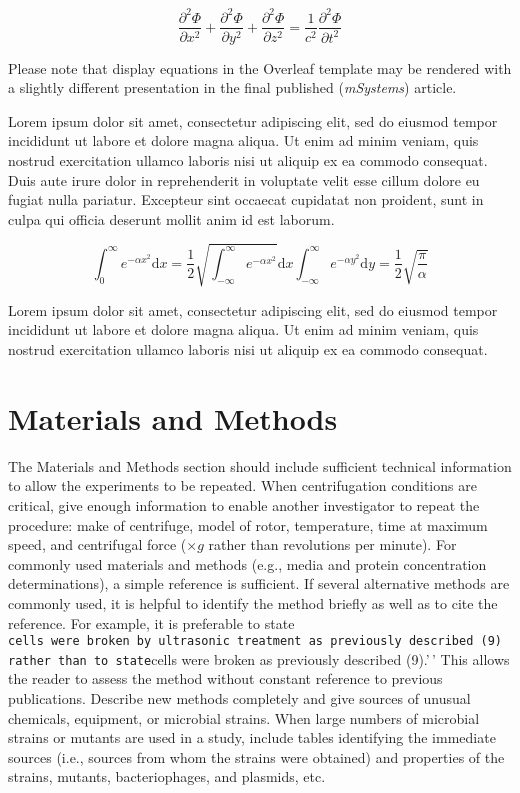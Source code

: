 \documentclass[
  lineno]{asm}
\begin{document}
\begin{equation}
\frac{\partial^2 \Phi}{\partial x^2} + \frac{\partial^2 \Phi}{\partial y^2} +
            \frac{\partial^2 \Phi}{\partial z^2} =
            \frac{1}{c^2}\frac{\partial^2\Phi}{\partial t^2}
\end{equation}

Please note that display equations in the Overleaf template may be
rendered with a slightly different presentation in the final published
(\emph{mSystems}) article.

Lorem ipsum dolor sit amet, consectetur adipiscing elit, sed do eiusmod
tempor incididunt ut labore et dolore magna aliqua. Ut enim ad minim
veniam, quis nostrud exercitation ullamco laboris nisi ut aliquip ex ea
commodo consequat. Duis aute irure dolor in reprehenderit in voluptate
velit esse cillum dolore eu fugiat nulla pariatur. Excepteur sint
occaecat cupidatat non proident, sunt in culpa qui officia deserunt
mollit anim id est laborum.

\begin{equation}
\int_0^\infty e^{-\alpha x^2} \mathrm{d}x =
            \frac12\sqrt{\int_{-\infty}^\infty e^{-\alpha x^2}}
            \mathrm{d}x\int_{-\infty}^\infty e^{-\alpha y^2}\mathrm{d}y =
            \frac12\sqrt{\frac{\pi}{\alpha}}
\end{equation}

Lorem ipsum dolor sit amet, consectetur adipiscing elit, sed do eiusmod
tempor incididunt ut labore et dolore magna aliqua. Ut enim ad minim
veniam, quis nostrud exercitation ullamco laboris nisi ut aliquip ex ea
commodo consequat.

\section{Materials and Methods}\label{materials-and-methods}

The Materials and Methods section should include sufficient technical
information to allow the experiments to be repeated. When centrifugation
conditions are critical, give enough information to enable another
investigator to repeat the procedure: make of centrifuge, model of
rotor, temperature, time at maximum speed, and centrifugal force
(\(\times g\) rather than revolutions per minute). For commonly used
materials and methods (e.g., media and protein concentration
determinations), a simple reference is sufficient. If several
alternative methods are commonly used, it is helpful to identify the
method briefly as well as to cite the reference. For example, it is
preferable to state
\texttt{cells\ were\ broken\ by\ ultrasonic\ treatment\ as\ previously\ described\ (9)\textquotesingle{}\textquotesingle{}\ rather\ than\ to\ state}cells
were broken as previously described (9).'\,' This allows the reader to
assess the method without constant reference to previous publications.
Describe new methods completely and give sources of unusual chemicals,
equipment, or microbial strains. When large numbers of microbial strains
or mutants are used in a study, include tables identifying the immediate
sources (i.e., sources from whom the strains were obtained) and
properties of the strains, mutants, bacteriophages, and plasmids, etc.
\end{document}
